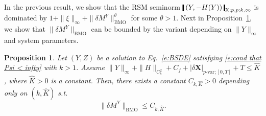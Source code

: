 \documentclass[11pt,reqno]{amsart}
\newtheorem{proposition}[lemma]{Proposition}
\numberwithin{equation}{section}
\newcommand{\shortthickbar}{%
  \vcenter{\hbox{\rule{1.8pt}{2.2ex}}}%
}
\newcommand{\thicknm}[1]{%
  \mathopen{\shortthickbar}%
  \mkern4mu #1 \mkern4mu%
  \mathclose{\shortthickbar}%
}
\begin{document}
In the previous result, we show that the \textrm{RSM} seminorm  $\thicknm{(Y,-H(Y))}_{\mathrm X;p,p;k,\infty}$ is dominated by $1+\|\xi\|_\infty+\|\delta M^Y\|_{\text{BMO}}^{\theta}$ for some $\theta > 1$. Next in Proposition~\ref{prop:BMO and ess sup}, we show that  $\|\delta M^{Y}\|_{\mathrm{BMO}}$ can be bounded by the variant depending on $\|Y\|_\infty$ and system parameters. 

\begin{proposition}\label{prop:BMO and ess sup}
Let $(Y,Z)$ be a solution to Eq.~\eqref{e:BSDE} satisfying \eqref{e:cond that Psi < infty} with $k > 1$. Assume $\|Y\|_{\infty} + \|H\|_{C^{2}_b} + C_f + |\delta \mathbf X |_{p\text{-}\mathrm{var};[0,T]} + T \le \hat K$, where $\hat K > 0$ is a constant.
Then, there exists a constant $C_{k,\hat K} > 0$ depending only on $(k,\hat K)$ s.t.  
\begin{equation}\label{e:BMO <= 1}
\|\delta M^{Y}\|_{\mathrm{BMO}} \le C_{k,\hat K}.
\end{equation}
\end{proposition}
\end{document}
